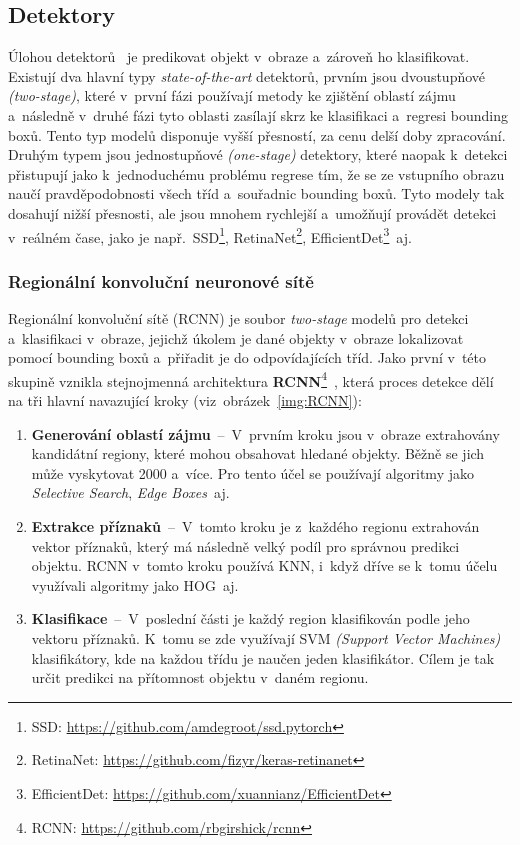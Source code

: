 \subsection{Detektory}
\label{sec:Detektory}
Úlohou detektorů~\cite{article:StageDetectors} je predikovat objekt v~obraze a~zároveň ho klasifikovat. Existují dva hlavní typy \emph{state-of-the-art} detektorů, prvním jsou dvoustupňové \emph{(two-stage)}, které v~první fázi používají metody ke zjištění oblastí zájmu a~následně v~druhé fázi tyto oblasti zasílají skrz \emph{} ke klasifikaci a~regresi bounding boxů. Tento typ modelů disponuje vyšší přesností, za cenu delší doby zpracování. Druhým typem jsou jednostupňové \emph{(one-stage)} detektory, které naopak k~detekci přistupují jako k~jednoduchému problému regrese tím, že se ze vstupního obrazu naučí pravděpodobnosti všech tříd a~souřadnic bounding boxů. Tyto modely tak dosahují nižší přesnosti, ale jsou mnohem rychlejší a~umožňují provádět detekci v~reálném čase, jako je např.~SSD\footnote{SSD: \url{https://github.com/amdegroot/ssd.pytorch}}, RetinaNet\footnote{RetinaNet: \url{https://github.com/fizyr/keras-retinanet}}, EfficientDet\footnote{EfficientDet: \url{https://github.com/xuannianz/EfficientDet}}~aj.

\subsubsection{Regionální konvoluční neuronové sítě}
Regionální konvoluční sítě (RCNN) je soubor \emph{two-stage} modelů pro detekci a~klasifikaci v~obraze, jejichž úkolem je dané objekty v~obraze lokalizovat pomocí bounding boxů a~přiřadit je do odpovídajících tříd. Jako první v~této skupině vznikla stejnojmenná architektura \textbf{RCNN}\footnote{RCNN: \url{https://github.com/rbgirshick/rcnn}}~\cite{article:RCNN}, která proces detekce dělí na tři hlavní navazující kroky (viz~obrázek~\ref{img:RCNN}):
\begin{enumerate}
    \item \textbf{Generování oblastí zájmu}~--~V~prvním kroku jsou v~obraze extrahovány kandidátní regiony, které mohou obsahovat hledané objekty. Běžně se jich může vyskytovat 2000 a~více. Pro tento účel se používají algoritmy jako \emph{Selective Search}, \emph{Edge Boxes}~aj.
    \item \textbf{Extrakce příznaků}~--~V~tomto kroku je z~každého regionu extrahován vektor příznaků, který má následně velký podíl pro správnou predikci objektu. RCNN v~tomto kroku používá KNN, i~když dříve se k~tomu účelu využívali algoritmy jako HOG~aj.
    \item \textbf{Klasifikace}~--~V~poslední části je každý region klasifikován podle jeho vektoru příznaků. K~tomu se zde využívají SVM \emph{(Support Vector Machines)} klasifikátory, kde na každou třídu je naučen jeden klasifikátor. Cílem je tak určit predikci na přítomnost objektu v~daném regionu.
\end{enumerate}

